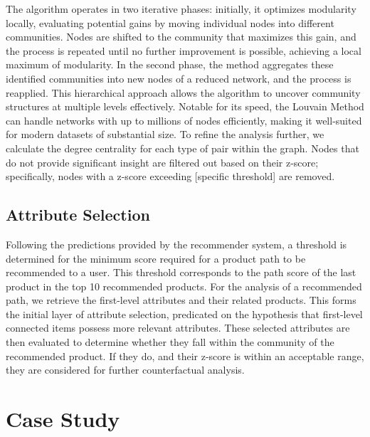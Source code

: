 The algorithm operates in two iterative phases: initially, it optimizes modularity
locally, evaluating potential gains by moving individual nodes into different
communities. Nodes are shifted to the community that maximizes this gain, and
the process is repeated until no further improvement is possible, achieving a local
maximum of modularity. In the second phase, the method aggregates these identified
communities into new nodes of a reduced network, and the process is reapplied. This
hierarchical approach allows the algorithm to uncover community structures at multiple
levels effectively. Notable for its speed, the Louvain Method can handle networks
with up to millions of nodes efficiently, making it well-suited for modern
datasets of substantial size. To refine the analysis further, we calculate the
degree centrality for each type of pair within the graph. Nodes that do not provide
significant insight are filtered out based on their z-score; specifically, nodes
with a z-score exceeding [specific threshold] are removed.


\subsection{Attribute Selection}
Following the predictions provided by the recommender system, a threshold is determined
for the minimum score required for a product path to be recommended to a user.
This threshold corresponds to the path score of the last product in the top 10
recommended products.
For the analysis of a recommended path, we retrieve the first-level attributes and
their related products. This forms the initial layer of attribute selection, predicated
on the hypothesis that first-level connected items possess more relevant attributes.
These selected attributes are then evaluated to determine whether they fall
within the community of the recommended product. If they do, and their z-score
is within an acceptable range, they are considered for further counterfactual analysis.



\section{Case Study}